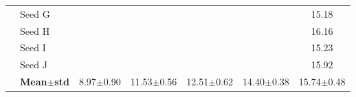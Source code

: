 \begin{table}[H]
{\begin{tabular}{@{}llccccc@{}}
  & Seed G & \cellcolor{RoyalBlue!10}{\small 8.71} & \cellcolor{RoyalBlue!10}{\small 11.97} & \cellcolor{RoyalBlue!10}{\small 11.90} & \cellcolor{RoyalBlue!10}{\small 14.55} & {\small\color{gray!60!black}15.18} \\
  & Seed H & \cellcolor{RoyalBlue!10}{\small 10.39} & \cellcolor{RoyalBlue!10}{\small 12.19} & \cellcolor{RoyalBlue!10}{\small 13.61} & \cellcolor{RoyalBlue!10}{\small 14.15} & {\small\color{gray!60!black}16.16} \\
  & Seed I & \cellcolor{RoyalBlue!10}{\small 8.35} & \cellcolor{RoyalBlue!10}{\small 11.23} & \cellcolor{RoyalBlue!10}{\small 12.37} & \cellcolor{RoyalBlue!10}{\small 13.66} & {\small\color{gray!60!black}15.23} \\
  & Seed J & \cellcolor{RoyalBlue!10}{\small 8.89} & \cellcolor{RoyalBlue!10}{\small 10.67} & \cellcolor{RoyalBlue!10}{\small 12.39} & \cellcolor{RoyalBlue!10}{\small 14.77} & {\small\color{gray!60!black}15.92} \\
 & \textbf{Mean$\pm$std} & \cellcolor{RoyalBlue!20}8.97$\pm$0.90 & \cellcolor{RoyalBlue!20}11.53$\pm$0.56 & \cellcolor{RoyalBlue!20}12.51$\pm$0.62 & \cellcolor{RoyalBlue!20}14.40$\pm$0.38 & \cellcolor{red!12}15.74$\pm$0.48 \\
\bottomrule
\end{tabular}
}
\end{table}


